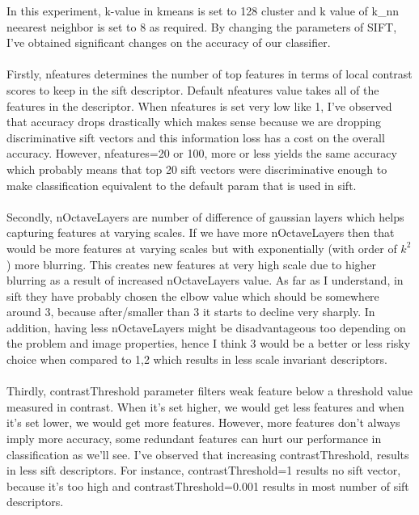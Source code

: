 \documentclass[12pt]{article}
\begin{document}
    \begin{center}
        \raggedright
        In this experiment, k-value in kmeans is set to 128 cluster and k value of k\_nn neearest neighbor is set to 8 as required.
        By changing the parameters of SIFT, I've obtained significant changes on the accuracy of our classifier.
        \\~\\
        Firstly, nfeatures determines the number of top features in terms of local contrast scores to keep in the sift descriptor. 
        Default nfeatures value takes all of the features in the descriptor. When nfeatures is set very low like 1, I've observed that accuracy drops drastically
        which makes sense because we are dropping discriminative sift vectors and this information loss has a cost on the overall accuracy.
        However, nfeatures=20 or 100, more or less yields the same accuracy which probably means that top 20 sift vectors were discriminative enough to make 
        classification equivalent to the default param that is used in sift.
        \\~\\
        Secondly, nOctaveLayers are number of difference of gaussian layers which helps capturing features at varying scales.
        If we have more nOctaveLayers then that would be more features at varying scales but with exponentially (with order of $k^{2}$) more blurring.
        This creates new features at very high scale due to higher blurring as a result of increased nOctaveLayers value.
        As far as I understand, in sift they have probably chosen the elbow value which should be somewhere around 3, because after/smaller than 3 it starts to decline very sharply.
        In addition, having less nOctaveLayers might be disadvantageous too depending on the problem and image properties, hence I think 3 would be a better or less risky choice when compared to 1,2 which results
        in less scale invariant descriptors.
        \\~\\
        Thirdly, contrastThreshold parameter filters weak feature below a threshold value measured in contrast.
        When it's set higher, we would get less features and when it's set lower, we would get more features.
        However, more features don't always imply more accuracy, some redundant features can hurt our performance in classification as we'll see.
        I've observed that increasing contrastThreshold, results in less sift descriptors. For instance, contrastThreshold=1 results no sift vector, because it's too high and contrastThreshold=0.001 results in most number of sift descriptors.

\end{center}
\end{document}
